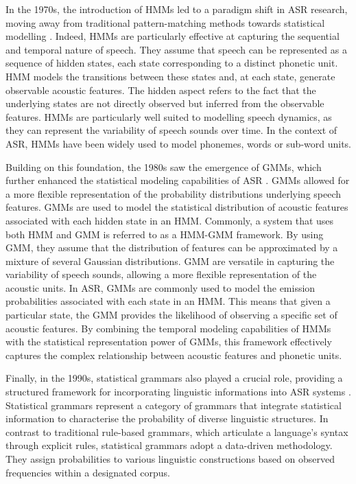 In the 1970s, the introduction of \acp{HMM} led to a paradigm shift in \ac{ASR} research, moving away from traditional pattern-matching methods towards statistical modelling \cite{first_asr}. Indeed, \acp{HMM} are particularly effective at capturing the sequential and temporal nature of speech. They assume that speech can be represented as a sequence of hidden states, each state corresponding to a distinct phonetic unit. \ac{HMM} models the transitions between these states and, at each state, generate observable acoustic features. The hidden aspect refers to the fact that the underlying states are not directly observed but inferred from the observable features. \acp{HMM} are particularly well suited to modelling speech dynamics, as they can represent the variability of speech sounds over time. In the context of \ac{ASR}, \acp{HMM} have been widely used to model phonemes, words or sub-word units.

Building on this foundation, the 1980s saw the emergence of \acp{GMM}, which further enhanced the statistical modeling capabilities of \ac{ASR} \cite{htk_book}. \acp{GMM} allowed for a more flexible representation of the probability distributions underlying speech features.
\acp{GMM} are used to model the statistical distribution of acoustic features associated with each hidden state in an \ac{HMM}. Commonly, a system that uses both \ac{HMM} and \ac{GMM} is referred to as a \ac{HMM-GMM} framework. By using \ac{GMM}, they assume that the distribution of features can be approximated by a mixture of several Gaussian distributions. \ac{GMM} are versatile in capturing the variability of speech sounds, allowing a more flexible representation of the acoustic units. In \ac{ASR}, \acp{GMM} are commonly used to model the emission probabilities associated with each state in an \ac{HMM}. This means that given a particular state, the \ac{GMM} provides the likelihood of observing a specific set of acoustic features. By combining the temporal modeling capabilities of \acp{HMM} with the statistical representation power of \acp{GMM}, this framework effectively captures the complex relationship between acoustic features and phonetic units.

Finally, in the 1990s, statistical grammars also played a crucial role, providing a structured framework for incorporating linguistic informations into \ac{ASR} systems \cite{darpa1992}. Statistical grammars represent a category of grammars that integrate statistical information to characterise the probability of diverse linguistic structures. In contrast to traditional rule-based grammars, which articulate a language's syntax through explicit rules, statistical grammars adopt a data-driven methodology. They assign probabilities to various linguistic constructions based on observed frequencies within a designated corpus.

